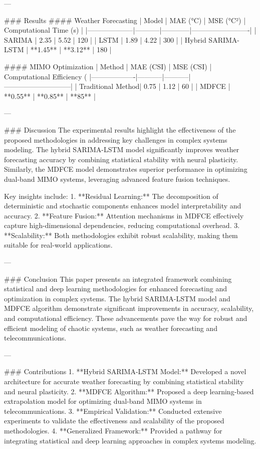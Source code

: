 ---

### Results
#### Weather Forecasting
| Model              | MAE (°C) | MSE (°C²) | Computational Time (s) |
|--------------------|-----------|------------|-------------------------|
| SARIMA            | 2.35      | 5.52       | 120                     |
| LSTM              | 1.89      | 4.22       | 300                     |
| Hybrid SARIMA-LSTM | **1.45**  | **3.12**   | 180                     |

#### MIMO Optimization
| Method            | MAE (CSI) | MSE (CSI) | Computational Efficiency (%
|-------------------|-----------|-----------|-----------------------------|
| Traditional Method| 0.75      | 1.12      | 60                          |
| MDFCE             | **0.55**  | **0.85**  | **85**                      |

---

### Discussion
The experimental results highlight the effectiveness of the proposed methodologies in addressing key challenges in complex systems modeling. The hybrid SARIMA-LSTM model significantly improves weather forecasting accuracy by combining statistical stability with neural plasticity. Similarly, the MDFCE model demonstrates superior performance in optimizing dual-band MIMO systems, leveraging advanced feature fusion techniques.

Key insights include:
1. **Residual Learning:** The decomposition of deterministic and stochastic components enhances model interpretability and accuracy.
2. **Feature Fusion:** Attention mechanisms in MDFCE effectively capture high-dimensional dependencies, reducing computational overhead.
3. **Scalability:** Both methodologies exhibit robust scalability, making them suitable for real-world applications.

---

### Conclusion
This paper presents an integrated framework combining statistical and deep learning methodologies for enhanced forecasting and optimization in complex systems. The hybrid SARIMA-LSTM model and MDFCE algorithm demonstrate significant improvements in accuracy, scalability, and computational efficiency. These advancements pave the way for robust and efficient modeling of chaotic systems, such as weather forecasting and telecommunications.

---

### Contributions
1. **Hybrid SARIMA-LSTM Model:** Developed a novel architecture for accurate weather forecasting by combining statistical stability and neural plasticity.
2. **MDFCE Algorithm:** Proposed a deep learning-based extrapolation model for optimizing dual-band MIMO systems in telecommunications.
3. **Empirical Validation:** Conducted extensive experiments to validate the effectiveness and scalability of the proposed methodologies.
4. **Generalized Framework:** Provided a pathway for integrating statistical and deep learning approaches in complex systems modeling.